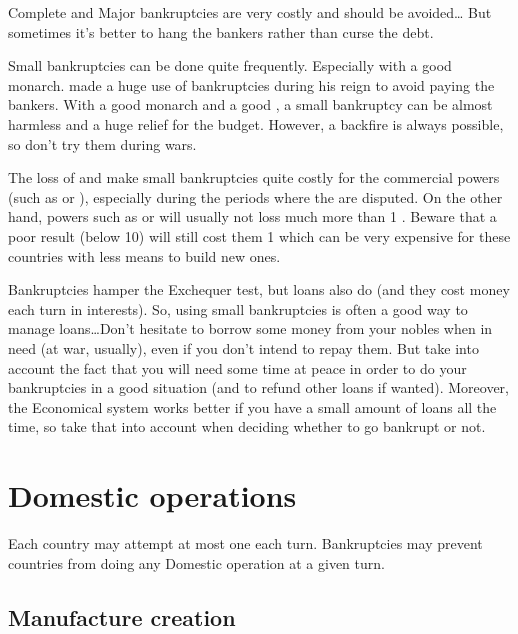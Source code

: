 \begin{playtip}
  Complete and Major bankruptcies are very costly and should be avoided\ldots
  But sometimes it's better to hang the bankers rather than curse the debt.

  Small bankruptcies can be done quite frequently. Especially with a good
  monarch.  made a huge use of bankruptcies during his
  reign to avoid paying the bankers. With a good monarch and a good \STAB, a
  small bankruptcy can be almost harmless and a huge relief for the
  budget. However, a backfire is always possible, so don't try them during
  wars.

  The loss of \TradeFLEET and \TFI make small bankruptcies quite costly for
  the commercial powers (such as \ANG or \HOL), especially during the periods
  where the  are disputed. On the other hand, powers such
  as \RUS or \POL will usually not loss much more than 1 \STAB. Beware that a
  poor result (below 10) will still cost them 1 \MNU which can be very
  expensive for these countries with less means to build new ones.

  Bankruptcies hamper the Exchequer test, but loans also do (and they cost
  money each turn in interests). So, using small bankruptcies is often a good
  way to manage loans\ldots Don't hesitate to borrow some money from your
  nobles when in need (at war, usually), even if you don't intend to repay
  them. But take into account the fact that you will need some time at peace
  in order to do your bankruptcies in a good situation (and to refund other
  loans if wanted). Moreover, the Economical system works better if you have a
  small amount of loans all the time, so take that into account when deciding
  whether to go bankrupt or not.
\end{playtip}




\section{Domestic operations}

\aparag Each country may attempt at most one  each
turn.
\bparag Bankruptcies may prevent countries from doing any Domestic operation
at a given turn.



\subsection{Manufacture creation}

